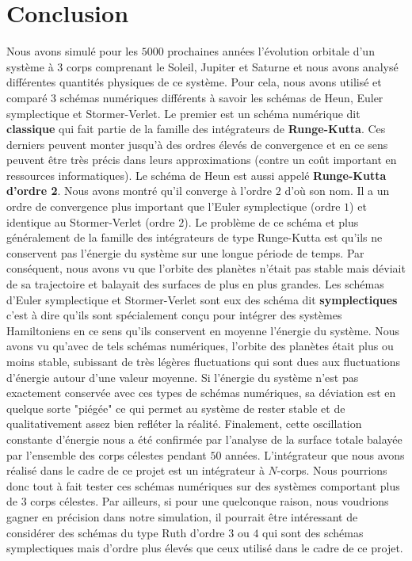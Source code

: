 \documentclass[11pt,twoside=semi,openright,numbers=noenddot]{article}
\begin{document}
\section{Conclusion}
Nous avons simulé pour les $5000$ prochaines années l'évolution orbitale d'un système à $3$ corps comprenant le Soleil, Jupiter et Saturne et nous avons analysé différentes quantités physiques de ce système. Pour cela, nous avons utilisé et comparé $3$ schémas numériques différents à savoir les schémas de Heun, Euler symplectique et Stormer-Verlet. Le premier est un schéma numérique dit \textbf{classique} qui fait partie de la famille des intégrateurs de \textbf{Runge-Kutta}. Ces derniers peuvent monter jusqu'à des ordres élevés de convergence et en ce sens peuvent être très précis dans leurs approximations (contre un coût important en ressources informatiques). Le schéma de Heun est aussi appelé \textbf{Runge-Kutta d'ordre 2}. Nous avons montré qu'il converge à l'ordre $2$ d'où son nom. Il a un ordre de convergence plus important que l'Euler symplectique (ordre $1$) et identique au Stormer-Verlet (ordre $2$). Le problème de ce schéma et plus généralement de la famille des intégrateurs de type Runge-Kutta est qu'ils ne conservent pas l'énergie du système sur une longue période de temps. Par conséquent, nous avons vu que l'orbite des planètes n'était pas stable mais déviait de sa trajectoire et balayait des surfaces de plus en plus grandes. Les schémas d'Euler symplectique et Stormer-Verlet sont eux des schéma dit \textbf{symplectiques} c'est à dire qu'ils sont spécialement conçu pour intégrer des systèmes Hamiltoniens en ce sens qu'ils conservent en moyenne l'énergie du système. Nous avons vu qu'avec de tels schémas numériques, l'orbite des planètes était plus ou moins stable, subissant de très légères fluctuations qui sont dues aux fluctuations d'énergie autour d'une valeur moyenne. Si l'énergie du système n'est pas exactement conservée avec ces types de schémas numériques, sa déviation est en quelque sorte "piégée" ce qui permet au système de rester stable et de qualitativement assez bien refléter la réalité. Finalement, cette oscillation constante d'énergie nous a été confirmée par l'analyse de la surface totale balayée par l'ensemble des corps célestes pendant $50$ années. L'intégrateur que nous avons réalisé dans le cadre de ce projet est un intégrateur à $N$-corps. Nous pourrions donc tout à fait tester ces schémas numériques sur des systèmes comportant plus de 3 corps célestes. Par ailleurs, si pour une quelconque raison, nous voudrions gagner en précision dans notre simulation, il pourrait être intéressant de considérer des schémas du type Ruth d'ordre $3$ ou $4$ qui sont des schémas symplectiques mais d'ordre plus élevés que ceux utilisé dans le cadre de ce projet.
\end{document}
